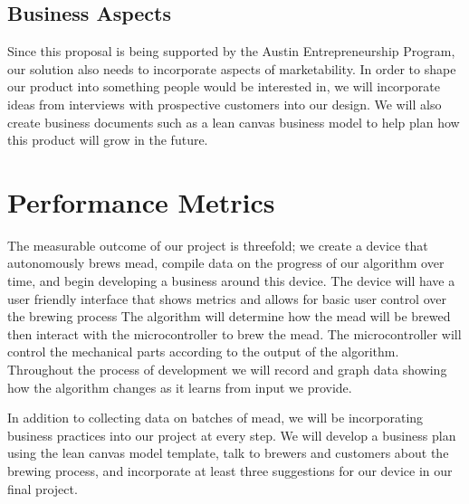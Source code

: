 \documentclass[letterpaper,10pt]{article}
\begin{document}
\subsection{Business Aspects}
Since this proposal is being supported by the Austin Entrepreneurship Program, our 
solution also needs to incorporate aspects of marketability. In order to shape our 
product into something people would be interested in, we will incorporate ideas 
from interviews with prospective customers into our design. We will also create 
business documents such as a lean canvas business model to help plan how this product 
will grow in the future.
\section{Performance Metrics}
The measurable outcome of our project is threefold; we create a device that 
autonomously brews mead, compile data on the progress of our algorithm 
over time, and begin developing a business around this device. 
The device will have a user friendly interface that shows metrics and allows
for basic user control over the brewing process The algorithm will determine
how the mead will be brewed then interact with the microcontroller to brew 
the mead. The microcontroller will control the mechanical parts according to
the output of the algorithm. Throughout the process of development we 
will record and graph data showing how the algorithm changes as it learns 
from input we provide. 

In addition to collecting data on batches of mead, we will be 
incorporating business practices into our project at every step. We will 
develop a business plan using the lean canvas model template, talk to 
brewers and customers about the brewing process, and incorporate at least 
three suggestions for our device in our final project.
\end{document}
